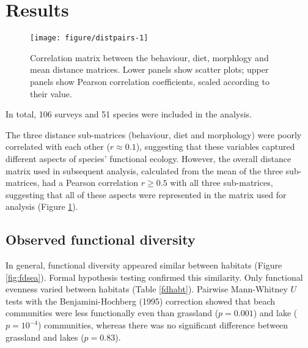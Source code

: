 \documentclass[12pt,a4paper]{article}\usepackage[]{graphicx}\usepackage[]{color}
\author{Josh Nightingale}
\newenvironment{knitrout}{}{} %
\begin{document}
\section*{Results}







\begin{knitrout}
\color{fgcolor}\begin{figure}[t]

{\centering \texttt{[image: figure/distpairs-1]} 

}

\caption[Correlation matrix between the behaviour, diet, morphlogy and mean distance matrices]{Correlation matrix between the behaviour, diet, morphlogy and mean distance matrices. Lower panels show scatter plots; upper panels show Pearson correlation coefficients, scaled according to their value.}\label{fig:distpairs}
\end{figure}


\end{knitrout}

In total, 106 surveys and 51 species were included in the analysis. 

The three distance sub-matrices (behaviour, diet and morphology) were poorly correlated with each other ($r \approx 0.1$), suggesting that these variables captured different aspects of species' functional ecology. 
However, the overall distance matrix used in subsequent analysis, calculated from the mean of the three sub-matrices, had a Pearson correlation $r \geq 0.5$ with all three sub-matrices, suggesting that all of these aspects were represented in the matrix used for analysis (Figure \ref{fig:distpairs}).

\clearpage
\subsection{Observed functional diversity}





In general, functional diversity appeared similar between habitats (Figure \ref{fig:fdsea}). Formal hypothesis testing confirmed this similarity. Only functional evenness varied between habitats (Table \ref{fdhabt}). Pairwise Mann-Whitney $U$ tests with the Benjamini-Hochberg (1995) correction showed that beach communities were less functionally even than grassland ($p = 0.001$) and lake ($p = \ensuremath{10^{-4}}$) communities, whereas there was no significant difference between grassland and lakes ($p = 0.83$).
\end{document}
